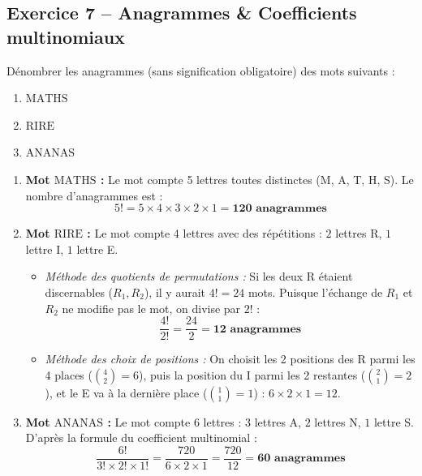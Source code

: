 \documentclass[11pt,a4paper]{article}
\begin{document}
\vspace{0.3cm}

\subsection*{Exercice 7 -- Anagrammes \& Coefficients multinomiaux}

Dénombrer les anagrammes (sans signification obligatoire) des mots suivants :
\begin{enumerate}[label=\arabic*.]
    \item $\mathrm{MATHS}$
    \item $\mathrm{RIRE}$
    \item $\mathrm{ANANAS}$
\end{enumerate}

\begin{correctionbox}
\begin{enumerate}[label=\arabic*.]
    \item \textbf{Mot $\mathrm{MATHS}$ :}
    Le mot compte 5 lettres toutes distinctes (M, A, T, H, S).
    Le nombre d'anagrammes est :
    \[
    5! = 5 \times 4 \times 3 \times 2 \times 1 = \mathbf{120\text{ anagrammes}}
    \]

    \item \textbf{Mot $\mathrm{RIRE}$ :}
    Le mot compte 4 lettres avec des répétitions : $2$ lettres R, $1$ lettre I, $1$ lettre E.
    \begin{itemize}[label=$\bullet$]
        \item \emph{Méthode des quotients de permutations :} Si les deux R étaient discernables ($R_1, R_2$), il y aurait $4! = 24$ mots. Puisque l'échange de $R_1$ et $R_2$ ne modifie pas le mot, on divise par $2!$ :
        \[
        \frac{4!}{2!} = \frac{24}{2} = \mathbf{12\text{ anagrammes}}
        \]
        \item \emph{Méthode des choix de positions :} On choisit les 2 positions des R parmi les 4 places ($\binom{4}{2} = 6$), puis la position du I parmi les 2 restantes ($\binom{2}{1} = 2$), et le E va à la dernière place ($\binom{1}{1} = 1$) : $6 \times 2 \times 1 = 12$.
    \end{itemize}

    \item \textbf{Mot $\mathrm{ANANAS}$ :}
    Le mot compte 6 lettres : $3$ lettres A, $2$ lettres N, $1$ lettre S.
    D'après la formule du coefficient multinomial :
    \[
    \frac{6!}{3! \times 2! \times 1!} = \frac{720}{6 \times 2 \times 1} = \frac{720}{12} = \mathbf{60\text{ anagrammes}}
    \]
\end{enumerate}
\end{correctionbox}
\end{document}
